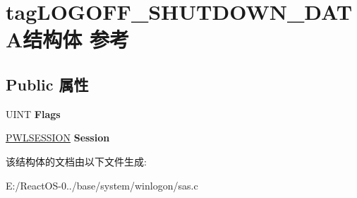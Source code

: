 \hypertarget{structtag_l_o_g_o_f_f___s_h_u_t_d_o_w_n___d_a_t_a}{}\section{tag\+L\+O\+G\+O\+F\+F\+\_\+\+S\+H\+U\+T\+D\+O\+W\+N\+\_\+\+D\+A\+T\+A结构体 参考}
\label{structtag_l_o_g_o_f_f___s_h_u_t_d_o_w_n___d_a_t_a}
\subsection*{Public 属性}
\begin{DoxyCompactItemize}
\item 
\mbox{\label{structtag_l_o_g_o_f_f___s_h_u_t_d_o_w_n___d_a_t_a_afb3a70d5cb19609cf31290545c6922e4}} 
U\+I\+NT {\bfseries Flags}
\item 
\mbox{\label{structtag_l_o_g_o_f_f___s_h_u_t_d_o_w_n___d_a_t_a_ac8d81069eab3193fd11c690c65cac6da}} 
\hyperlink{struct___w_l_s_e_s_s_i_o_n}{P\+W\+L\+S\+E\+S\+S\+I\+ON} {\bfseries Session}
\end{DoxyCompactItemize}


该结构体的文档由以下文件生成\+:\begin{DoxyCompactItemize}
\item 
E\+:/\+React\+O\+S-\/0../base/system/winlogon/sas.\+c\end{DoxyCompactItemize}
